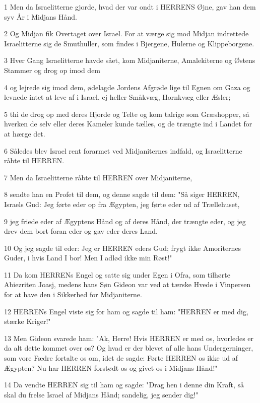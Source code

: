 \par 1 Men da Israelitterne gjorde, hvad der var ondt i HERRENS Øjne, gav han dem syv År i Midjans Hånd.
\par 2 Og Midjan fik Overtaget over Israel. For at værge sig mod Midjan indrettede Israelitterne sig de Smuthuller, som findes i Bjergene, Hulerne og Klippeborgene.
\par 3 Hver Gang Israelitterne havde sået, kom Midjaniterne, Amalekiterne og Østens Stammer og drog op imod dem
\par 4 og lejrede sig imod dem, ødelagde Jordens Afgrøde lige til Egnen om Gaza og levnede intet at leve af i Israel, ej heller Småkvæg, Hornkvæg eller Æsler;
\par 5 thi de drog op med deres Hjorde og Telte og kom talrige som Græshopper, så hverken de selv eller deres Kameler kunde tælles, og de trængte ind i Landet for at hærge det.
\par 6 Således blev Israel rent forarmet ved Midjaniternes indfald, og Israelitterne råbte til HERREN.
\par 7 Men da Israelitterne råbte til HERREN over Midjaniterne,
\par 8 sendte han en Profet til dem, og denne sagde til dem: "Så siger HERREN, Israels Gud: Jeg førte eder op fra Ægypten, jeg førte eder ud af Trællehuset,
\par 9 jeg friede eder af Ægyptens Hånd og af deres Hånd, der trængte eder, og jeg drev dem bort foran eder og gav eder deres Land.
\par 10 Og jeg sagde til eder: Jeg er HERREN eders Gud; frygt ikke Amoriternes Guder, i hvis Land I bor! Men I adlød ikke min Røst!"
\par 11 Da kom HERRENs Engel og satte sig under Egen i Ofra, som tilhørte Abiezriten Joasj, medens hans Søn Gideon var ved at tærske Hvede i Vinpersen for at have den i Sikkerhed for Midjaniterne.
\par 12 HERRENs Engel viste sig for ham og sagde til ham: "HERREN er med dig, stærke Kriger!"
\par 13 Men Gideon svarede ham: "Ak, Herre! Hvis HERREN er med os, hvorledes er da alt dette kommet over os? Og hvad er der blevet af alle hans Undergerninger, som vore Fædre fortalte os om, idet de sagde: Førte HERREN os ikke ud af Ægypten? Nu har HERREN forstødt os og givet os i Midjans Hånd!"
\par 14 Da vendte HERREN sig til ham og sagde: "Drag hen i denne din Kraft, så skal du frelse Israel af Midjans Hånd; sandelig, jeg sender dig!"
